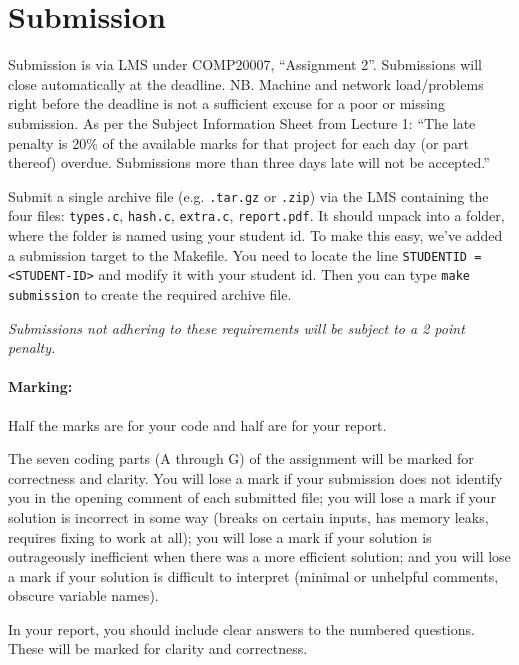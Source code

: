 \documentclass[11pt]{article}
\begin{document}
\section*{Submission}

Submission is via LMS under COMP20007, ``Assignment 2''.
Submissions will close automatically at the deadline.
NB\@. Machine and network load/problems right before the deadline is
not a sufficient excuse for a poor or missing submission.
As per the Subject Information Sheet from Lecture 1: ``The late penalty is 20\%
of the available marks for that project
for each day (or part thereof) overdue.
Submissions more than three days late will not be accepted.''

Submit a single archive file (e.g. \texttt{.tar.gz} or \texttt{.zip}) via the
LMS containing the four files:
\texttt{types.c},
\texttt{hash.c},
\texttt{extra.c},
\texttt{report.pdf}.
It should unpack into a folder, where the folder is named using your student id.
To make this easy, we've added a submission target to the Makefile.
You need to locate the line \texttt{STUDENTID = <STUDENT-ID>} and modify it with your student id.
Then you can type \texttt{make submission} to create the required archive file.

\emph{Submissions not adhering to these requirements will be subject to a 2 point penalty.}

\paragraph{Marking:}
Half the marks are for your code and half are for your report.

The seven coding parts (A through G) of the assignment will be marked for correctness and clarity.
You will lose a mark if your submission does not identify you in the opening comment of each submitted file;
you will lose a mark if your solution is incorrect in some way
(breaks on certain inputs, has memory leaks, requires fixing to work at all);
you will lose a mark if your solution is outrageously inefficient when there was a more efficient solution;
and you will lose a mark if your solution is difficult to interpret
(minimal or unhelpful comments, obscure variable names).

In your report, you should include clear answers to the numbered questions.  These will be marked for clarity and correctness.
\end{document}
